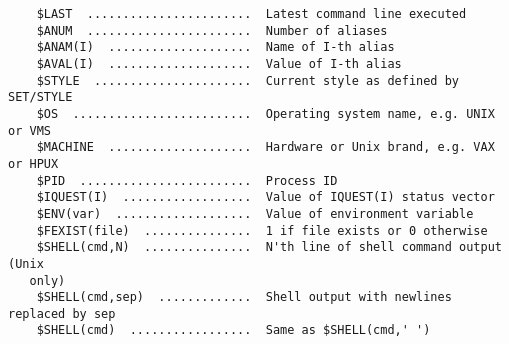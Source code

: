 \begin{verbatim}
    $LAST  .......................  Latest command line executed
    $ANUM  .......................  Number of aliases
    $ANAM(I)  ....................  Name of I-th alias
    $AVAL(I)  ....................  Value of I-th alias
    $STYLE  ......................  Current style as defined by SET/STYLE
    $OS  .........................  Operating system name, e.g. UNIX or VMS
    $MACHINE  ....................  Hardware or Unix brand, e.g. VAX or HPUX
    $PID  ........................  Process ID
    $IQUEST(I)  ..................  Value of IQUEST(I) status vector
    $ENV(var)  ...................  Value of environment variable
    $FEXIST(file)  ...............  1 if file exists or 0 otherwise
    $SHELL(cmd,N)  ...............  N'th line of shell command output (Unix 
   only)
    $SHELL(cmd,sep)  .............  Shell output with newlines replaced by sep
    $SHELL(cmd)  .................  Same as $SHELL(cmd,' ')
\end{verbatim}


